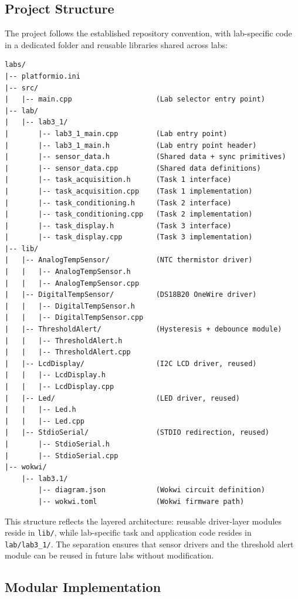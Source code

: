 \subsection{Project Structure}

The project follows the established repository convention, with lab-specific code in a dedicated folder and reusable libraries shared across labs:

\begin{lstlisting}[caption=Project directory structure for Lab 3.1, label=lst:project_structure]
labs/
|-- platformio.ini
|-- src/
|   |-- main.cpp                    (Lab selector entry point)
|-- lab/
|   |-- lab3_1/
|       |-- lab3_1_main.cpp         (Lab entry point)
|       |-- lab3_1_main.h           (Lab entry point header)
|       |-- sensor_data.h           (Shared data + sync primitives)
|       |-- sensor_data.cpp         (Shared data definitions)
|       |-- task_acquisition.h      (Task 1 interface)
|       |-- task_acquisition.cpp    (Task 1 implementation)
|       |-- task_conditioning.h     (Task 2 interface)
|       |-- task_conditioning.cpp   (Task 2 implementation)
|       |-- task_display.h          (Task 3 interface)
|       |-- task_display.cpp        (Task 3 implementation)
|-- lib/
|   |-- AnalogTempSensor/           (NTC thermistor driver)
|   |   |-- AnalogTempSensor.h
|   |   |-- AnalogTempSensor.cpp
|   |-- DigitalTempSensor/          (DS18B20 OneWire driver)
|   |   |-- DigitalTempSensor.h
|   |   |-- DigitalTempSensor.cpp
|   |-- ThresholdAlert/             (Hysteresis + debounce module)
|   |   |-- ThresholdAlert.h
|   |   |-- ThresholdAlert.cpp
|   |-- LcdDisplay/                 (I2C LCD driver, reused)
|   |   |-- LcdDisplay.h
|   |   |-- LcdDisplay.cpp
|   |-- Led/                        (LED driver, reused)
|   |   |-- Led.h
|   |   |-- Led.cpp
|   |-- StdioSerial/                (STDIO redirection, reused)
|       |-- StdioSerial.h
|       |-- StdioSerial.cpp
|-- wokwi/
    |-- lab3.1/
        |-- diagram.json            (Wokwi circuit definition)
        |-- wokwi.toml              (Wokwi firmware path)
\end{lstlisting}

This structure reflects the layered architecture: reusable driver-layer modules reside in \texttt{lib/}, while lab-specific task and application code resides in \texttt{lab/lab3\_1/}. The separation ensures that sensor drivers and the threshold alert module can be reused in future labs without modification.

\subsection{Modular Implementation}

